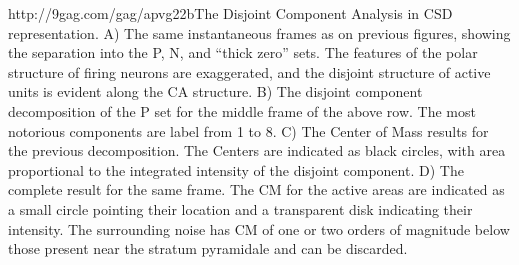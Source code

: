 http://9gag.com/gag/apvg22bThe Disjoint Component Analysis in CSD representation.
A) The same instantaneous frames as on previous figures, showing the separation into the P, N, and ``thick zero'' sets. The features of the polar structure of firing neurons are exaggerated, and the disjoint structure of active units is evident along the CA structure.
B) The disjoint component decomposition of the P set for the middle frame of the above row. The most notorious components are label from 1 to 8.
C) The Center of Mass results for the previous decomposition. The Centers are indicated as black circles, with area proportional to the integrated intensity of the disjoint component.
D) The complete result for the same frame. The CM for the active areas are indicated as a small circle pointing their location and a transparent disk indicating their intensity. The surrounding noise has CM of one or two orders of magnitude below those present near the stratum pyramidale and can be discarded. 
